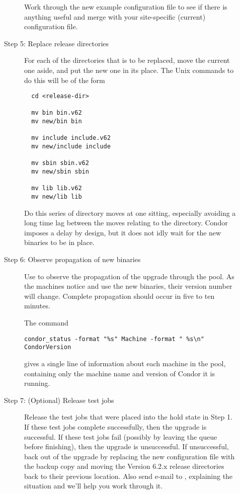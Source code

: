 \begin{description}
\begin{description}
Work through the new
\VersionNotice
example configuration file to see if there
is anything useful and merge with your site-specific (current)
configuration file.

\item[Step 5:  Replace release directories]
For each of the directories that is to be replaced,
move the current one aside, and put the new one in its place.
The Unix commands to do this will be of the form
\begin{verbatim}
  cd <release-dir>

  mv bin bin.v62
  mv new/bin bin

  mv include include.v62
  mv new/include include

  mv sbin sbin.v62
  mv new/sbin sbin

  mv lib lib.v62
  mv new/lib lib
\end{verbatim}

Do this series of directory moves at one
sitting, especially avoiding a long time lag between the moves
relating to the  directory.
Condor imposes a delay by design, but it does not idly wait for the
new binaries to be in place.

\item[Step 6:  Observe propagation of new binaries]

Use  to observe the propagation of the upgrade
through the pool.
As the machines notice and use the new binaries, their
version number will change.
Complete propagation should occur in five to ten minutes.

The command
\begin{verbatim}
condor_status -format "%s" Machine -format " %s\n" CondorVersion
\end{verbatim}
gives a single line of information about each machine in the pool,
containing only the machine name and version of Condor it is
running.

\item[Step 7:  (Optional) Release test jobs]
Release the test jobs that were placed into the hold state
in Step 1.
If these test jobs complete successfully, then the upgrade is
successful.
If these test jobs fail (possibly by leaving the queue before
finishing), then the upgrade is unsuccessful.
If unsuccessful, back out of the upgrade by
replacing the new configuration file with the backup copy and
moving the Version 6.2.x release directories back to their
previous location.
Also send e-mail to ,
explaining the situation and we'll help you work through it.


\end{description}
\end{description}
